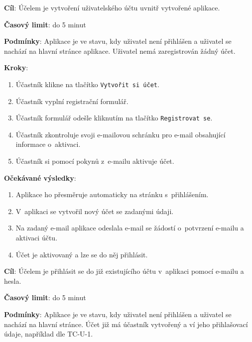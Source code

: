 
\vspace{1em}

\textbf{Cíl}: Účelem je vytvoření uživatelského účtu uvnitř vytvořené aplikace.

\textbf{Časový limit}: do 5 minut

\textbf{Podmínky}: Aplikace je ve stavu, kdy uživatel není přihlášen a uživatel se nachází na hlavní stránce aplikace. Uživatel nemá zaregistrován žádný účet.

\textbf{Kroky}:

\begin{enumerate}[leftmargin=1.4cm]
    \item Účastník klikne na tlačítko \verb|Vytvořit si účet|.
    \item Účastník vyplní registrační formulář.
    \item Účastník formulář odešle kliknutím na tlačítko \verb|Registrovat se|.
    \item Účastník zkontroluje svoji e-mailovou schránku pro e-mail obsahující informace o~aktivaci.
    \item Účastník si pomocí pokynů z~e-mailu aktivuje účet.
\end{enumerate}

\textbf{Očekávané výsledky}:

\begin{enumerate}[leftmargin=1.4cm]
    \item Aplikace ho přesměruje automaticky na stránku s~přihlášením.
    \item V~aplikaci se vytvořil nový účet se zadanými údaji.
    \item Na zadaný e-mail aplikace odeslala e-mail se žádostí o~potvrzení e-mailu a aktivaci účtu.
    \item Účet je aktivovaný a lze se do něj přihlásit.
\end{enumerate}


\vspace{1em}

\textbf{Cíl}: Účelem je přihlásit se do již existujícího účtu v~aplikaci pomocí e-mailu a hesla.

\textbf{Časový limit}: do 5 minut

\textbf{Podmínky}: Aplikace je ve stavu, kdy uživatel není přihlášen a uživatel se nachází na hlavní stránce. Účet již má účastník vytvořený a ví jeho přihlašovací údaje, například dle TC-U-1.

